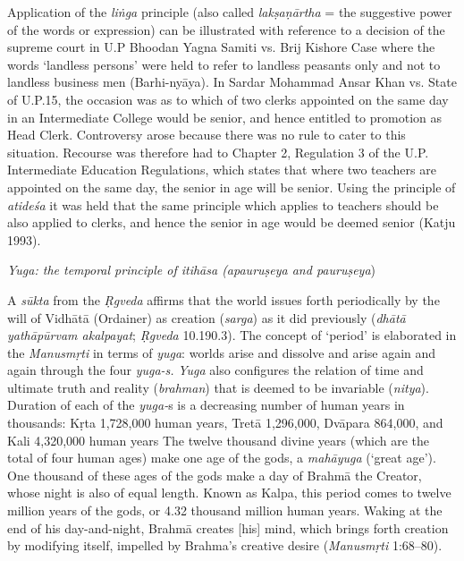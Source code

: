 Application of the \textit{liṅga} principle (also called \textit{lakṣaṇārtha} = the suggestive power of the words or expression) can be illustrated with reference to a decision of the supreme court in U.P Bhoodan Yagna Samiti vs. Brij Kishore Case where the words ‘landless persons’ were held to refer to landless peasants only and not to landless business men (Barhi-nyāya). In Sardar Mohammad Ansar Khan vs. State of U.P.15, the occasion was as to which of two clerks appointed on the same day in an Intermediate College would be senior, and hence entitled to promotion as Head Clerk. Controversy arose because there was no rule to cater to this situation. Recourse was therefore had to Chapter 2, Regulation 3 of the U.P. Intermediate Education Regulations, which states that where two teachers are appointed on the same day, the senior in age will be senior. Using the principle of \textit{atideśa} it was held that the same principle which applies to teachers should be also applied to clerks, and hence the senior in age would be deemed senior (Katju 1993).

\textit{Yuga: the temporal principle of itihāsa (apauruṣeya and pauruṣeya})

A \textit{sūkta} from the \textit{Ṛgveda} affirms that the world issues forth periodically by the will of Vidhātā (Ordainer) as creation (\textit{sarga}) as it did previously (\textit{dhātā yathāpūrvam akalpayat}; \textit{Ṛgveda} 10.190.3). The concept of ‘period’ is elaborated in the \textit{Manusmṛti} in terms of \textit{yuga}: worlds arise and dissolve and arise again and again through the four \textit{yuga-s.} \textit{Yuga} also configures the relation of time and ultimate truth and reality (\textit{brahman}) that is deemed to be invariable (\textit{nitya}). Duration of each of the \textit{yuga-}s is a decreasing number of human years in thousands: Kṛta 1,728,000 human years, Tretā 1,296,000, Dvāpara 864,000, and Kali 4,320,000 human years The twelve thousand divine years (which are the total of four human ages) make one age of the gods, a \textit{mahāyuga} (‘great age’). One thousand of these ages of the gods make a day of Brahmā the Creator, whose night is also of equal length. Known as Kalpa, this period comes to twelve million years of the gods, or 4.32 thousand million human years. Waking at the end of his day-and-night, Brahmā creates [his] mind, which brings forth creation by modifying itself, impelled by Brahma’s creative desire (\textit{Manusmṛti} 1:68–80).

